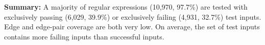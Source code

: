 \textbf{Summary:}
A majority of regular expressions (10,970, 97.7\%) are tested with exclusively passing (6,029, 39.9\%) or exclusively failing (4,931, 32.7\%) test inputs. 
Edge and edge-pair coverage are both very low. 
On average, the set of test inputs contains more failing inputs than successful inputs. 


